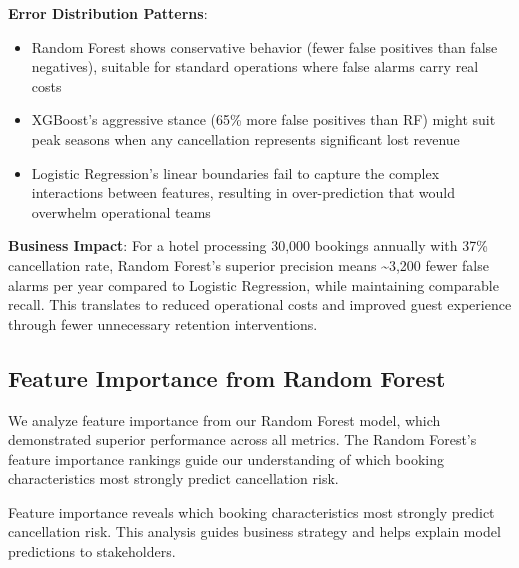 \documentclass[
  letterpaper,
  DIV=11,
  numbers=noendperiod]{scrartcl}
\providecommand{\tightlist}{%
  \setlength{\itemsep}{0pt}\setlength{\parskip}{0pt}}
\begin{document}
\textbf{Error Distribution Patterns}:

\begin{itemize}
\tightlist
\item
  Random Forest shows conservative behavior (fewer false positives than
  false negatives), suitable for standard operations where false alarms
  carry real costs
\item
  XGBoost's aggressive stance (65\% more false positives than RF) might
  suit peak seasons when any cancellation represents significant lost
  revenue
\item
  Logistic Regression's linear boundaries fail to capture the complex
  interactions between features, resulting in over-prediction that would
  overwhelm operational teams
\end{itemize}

\textbf{Business Impact}: For a hotel processing 30,000 bookings
annually with 37\% cancellation rate, Random Forest's superior precision
means \textasciitilde3,200 fewer false alarms per year compared to
Logistic Regression, while maintaining comparable recall. This
translates to reduced operational costs and improved guest experience
through fewer unnecessary retention interventions.

\subsection{Feature Importance from Random
Forest}\label{feature-importance-from-random-forest}

We analyze feature importance from our Random Forest model, which
demonstrated superior performance across all metrics. The Random
Forest's feature importance rankings guide our understanding of which
booking characteristics most strongly predict cancellation risk.

Feature importance reveals which booking characteristics most strongly
predict cancellation risk. This analysis guides business strategy and
helps explain model predictions to stakeholders.
\end{document}
